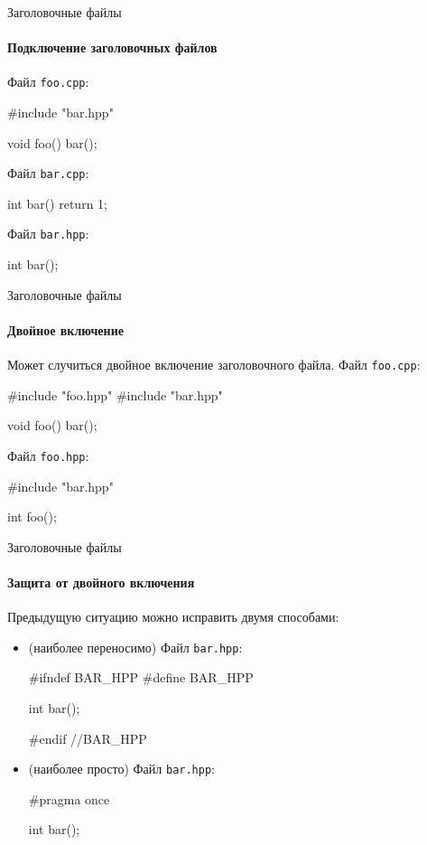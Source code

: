 \documentclass[
    9pt,
    hyperref={pdfencoding=unicode}
    ]{beamer}
\begin{document}
\begin{frame}[fragile]{Заголовочные файлы}
    \framesubtitle{Подключение заголовочных файлов}
    Файл \texttt{foo.cpp}:
    \begin{cppcode}
        #include "bar.hpp"
        
        void foo()
        {
            bar();        
        }
    \end{cppcode}
    
    \vspace{2em}
    Файл \texttt{bar.cpp}:
    \begin{cppcode}
        int bar(){ return 1; }
    \end{cppcode}

    \vspace{2em}
    Файл \texttt{bar.hpp}:
    \begin{cppcode}
        int bar();
    \end{cppcode}    
\end{frame}


\begin{frame}[fragile]{Заголовочные файлы}
    \framesubtitle{Двойное включение}
    Может случиться двойное включение заголовочного файла.
    Файл \texttt{foo.cpp}:
    \begin{cppcode}
        #include "foo.hpp"
        #include "bar.hpp"
        
        void foo()
        {
            bar();        
        }
    \end{cppcode}
    
    \vspace{2em}
    Файл \texttt{foo.hpp}:
    \begin{cppcode}
        #include "bar.hpp"
        
        int foo();
    \end{cppcode}  
\end{frame}


\begin{frame}[fragile]{Заголовочные файлы}
    \framesubtitle{Защита от двойного включения}
    Предыдущую ситуацию можно исправить двумя способами:
    \begin{itemize}
    \item (наиболее переносимо) Файл \texttt{bar.hpp}:
    \begin{cppcode}
        #ifndef BAR_HPP
        #define BAR_HPP
        
        int bar();
        
        #endif //BAR_HPP
    \end{cppcode}

    \item (наиболее просто) Файл \texttt{bar.hpp}:
    \begin{cppcode}
        #pragma once
        
        int bar();
    \end{cppcode}  
    \end{itemize}
    
\end{frame}
\end{document}
